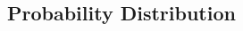 \documentclass[]{article}
\date{}
\begin{document}
\begin{multicols}{2}
    \section*{Probability Distribution}

\end{multicols}
\end{document}
